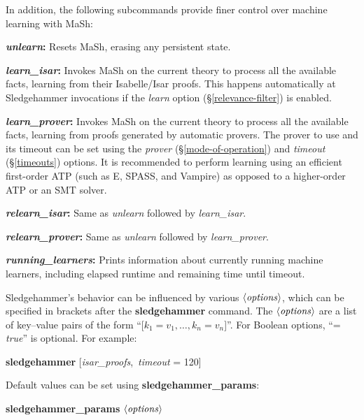 \documentclass[a4paper,12pt]{article}
\def\qty#1{\ensuremath{\left<\mathit{#1\/}\right>}}
\begin{document}
In addition, the following subcommands provide finer control over machine
learning with MaSh:

\begin{enum}
\item[\labelitemi] \textbf{\textit{unlearn}:} Resets MaSh, erasing any
persistent state.

\item[\labelitemi] \textbf{\textit{learn\_isar}:} Invokes MaSh on the current
theory to process all the available facts, learning from their Isabelle/Isar
proofs. This happens automatically at Sledgehammer invocations if the
\textit{learn} option (\S\ref{relevance-filter}) is enabled.

\item[\labelitemi] \textbf{\textit{learn\_prover}:} Invokes MaSh on the current
theory to process all the available facts, learning from proofs generated by
automatic provers. The prover to use and its timeout can be set using the
\textit{prover} (\S\ref{mode-of-operation}) and \textit{timeout}
(\S\ref{timeouts}) options. It is recommended to perform learning using an
efficient first-order ATP (such as E, SPASS, and Vampire) as opposed to a
higher-order ATP or an SMT solver.

\item[\labelitemi] \textbf{\textit{relearn\_isar}:} Same as \textit{unlearn}
followed by \textit{learn\_isar}.

\item[\labelitemi] \textbf{\textit{relearn\_prover}:} Same as \textit{unlearn}
followed by \textit{learn\_prover}.

\item[\labelitemi] \textbf{\textit{running\_learners}:} Prints information about
currently running machine learners, including elapsed runtime and remaining
time until timeout.
\end{enum}

Sledgehammer's behavior can be influenced by various \qty{options}, which can be
specified in brackets after the \textbf{sledgehammer} command. The
\qty{options} are a list of key--value pairs of the form ``[$k_1 = v_1,
\ldots, k_n = v_n$]''. For Boolean options, ``= \textit{true\/}'' is optional.
For example:

\prew
\textbf{sledgehammer} [\textit{isar\_proofs}, \,\textit{timeout} = 120]
\postw

Default values can be set using \textbf{sledgehammer\_\allowbreak params}:

\prew
\textbf{sledgehammer\_params} \qty{options}
\postw
\end{document}
